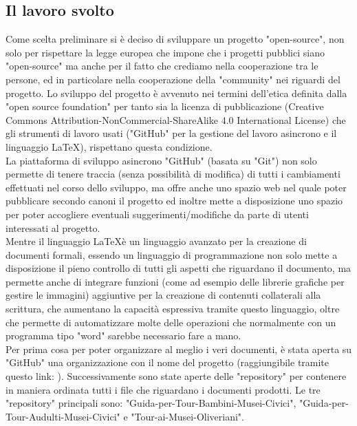 \documentclass[hidelinks,12pt,a4paper]{article}
\begin{document}
\begin{flushleft}
				\subsection{Il lavoro svolto}
				Come scelta preliminare si è deciso di sviluppare un progetto "open-source", non solo per rispettare la legge europea che impone che i progetti pubblici siano "open-source" ma anche per il fatto che crediamo nella cooperazione tra le persone, ed in particolare nella cooperazione della "community" nei riguardi del progetto. Lo sviluppo del progetto è avvenuto nei termini dell'etica definita dalla "open source foundation" per tanto sia la licenza di pubblicazione (Creative Commons Attribution-NonCommercial-ShareAlike 4.0 International License) che gli strumenti di lavoro usati ("GitHub" per la gestione del lavoro asincrono e il linguaggio \LaTeX), rispettano questa condizione.\\
				La piattaforma di sviluppo asincrono "GitHub" (basata su "Git") non solo permette di tenere traccia (senza possibilità di modifica) di tutti i cambiamenti effettuati nel corso dello sviluppo, ma offre anche uno spazio web nel quale poter pubblicare secondo canoni il progetto ed inoltre mette a disposizione uno spazio per poter accogliere eventuali suggerimenti/modifiche da parte di utenti interessati al progetto.\\
				Mentre il linguaggio \LaTeX è un linguaggio avanzato per la creazione di documenti formali, essendo un linguaggio di programmazione non solo mette a disposizione il pieno controllo di tutti gli aspetti che riguardano il documento, ma permette anche di integrare funzioni (come ad esempio delle librerie grafiche per gestire le immagini) aggiuntive per la creazione di contenuti collaterali alla scrittura, che aumentano la capacità espressiva tramite questo linguaggio, oltre che permette di automatizzare molte delle operazioni che normalmente con un programma tipo "word" sarebbe necessario fare a mano.\\
				 \bigskip
				 Per prima cosa per poter organizzare al meglio i veri documenti, è stata aperta su "GitHub" una organizzazione con il nome del progetto (raggiungibile tramite questo link: ). Successivamente sono state aperte delle "repository" per contenere in maniera ordinata tutti i file che riguardano i documenti prodotti. Le tre "repository" principali sono: "Guida-per-Tour-Bambini-Musei-Civici", "Guida-per-Tour-Audulti-Musei-Civici" e "Tour-ai-Musei-Oliveriani".\\

\end{flushleft}
\end{document}
